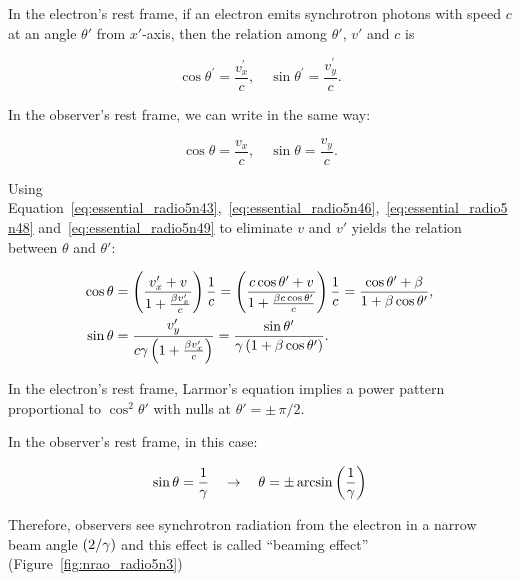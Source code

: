 In the electron's rest frame, if an electron emits synchrotron photons with speed $c$ at an angle $\theta'$ from $x'$-axis, then the relation among $\theta'$, $v'$ and $c$ is

\begin{equation}\label{eq:essential_radio5n48}
    \cos \theta^{\prime}=\frac{v_x^{\prime}}{c}, \quad \sin \theta^{\prime}=\frac{v_y^{\prime}}{c}.
\end{equation}

In the observer's rest frame, we can write in the same way:

\begin{equation}\label{eq:essential_radio5n49}
    \cos \theta=\frac{v_x}{c}, \quad \sin \theta=\frac{v_y}{c}.
\end{equation}

Using Equation~\ref{eq:essential_radio5n43},~\ref{eq:essential_radio5n46},~\ref{eq:essential_radio5n48} and~\ref{eq:essential_radio5n49} to eliminate $v$ and $v'$ yields the relation between $\theta$ and $\theta'$:

\begin{equation}\label{eq:essential_radio5n50}
    \begin{aligned}
        \cos \theta &= \left(\frac{v_x^{\prime}+v}{1+\frac{\beta v_x^{\prime}}{c}}\right) \frac{1}{c}=\left(\frac{c \cos \theta^{\prime}+v}{1+\frac{\beta c \cos \theta^{\prime}}{c}}\right) \frac{1}{c}=\frac{\cos \theta^{\prime}+\beta}{1+\beta \cos \theta^{\prime}}, \\
        \sin \theta &= \frac{v_y^{\prime}}{c \gamma\left(1+\frac{\beta v_{x}^{\prime}}{c}\right)} = \frac{\sin \theta^{\prime}}{\gamma\left(1+\beta \cos \theta^{\prime}\right)}.
    \end{aligned}
\end{equation}

In the electron's rest frame, Larmor's equation implies a power pattern proportional to $\cos^2\theta'$ with nulls at $\theta'=\pm\,\pi / 2$.

In the observer's rest frame, in this case:

\begin{equation}\label{eq:essential_radio5n52}
    \sin\theta = \frac{1}{\gamma} \quad \rightarrow \quad \theta=\pm \arcsin \left(\frac{1}{\gamma}\right)
\end{equation}

Therefore, observers see synchrotron radiation from the electron in a narrow beam angle $\left(2/\gamma\right)$ and this effect is called ``beaming effect'' (Figure~\ref{fig:nrao_radio5n3})

